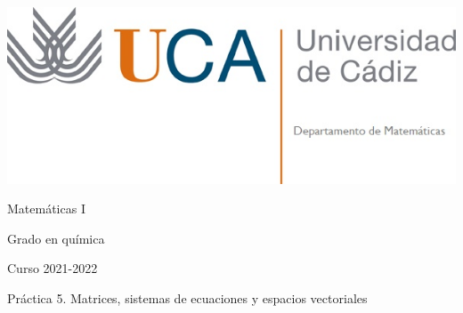 \documentclass{article}
\title{}
\author{}
\date{}
\begin{document}
\begin{minipage}{.4\textwidth}
 \includegraphics[width=\linewidth]{uca.jpg}
\end{minipage}
%
\begin{minipage}{.6\textwidth}
 \begin{flushright}
  {\Large Matemáticas I}

  \medskip
  {\large Grado en química}

  \medskip
  Curso 2021-2022
 \end{flushright}
\end{minipage}

{\large Práctica 5. Matrices, sistemas de ecuaciones y espacios vectoriales}

\vspace{-15pt}
\hrulefill












%
%
%
\end{document}
